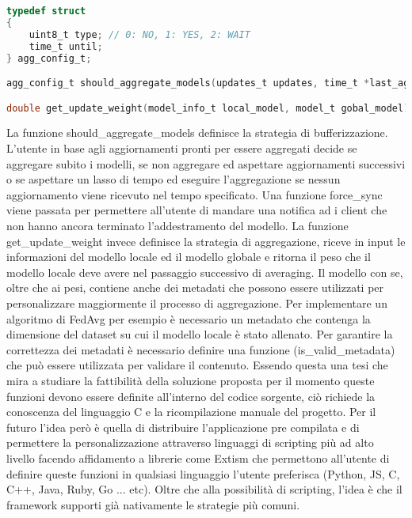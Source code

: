 \documentclass[a4paper, oneside, openright]{report}
\begin{document}
\lstset{style=longBlock}
\begin{lstlisting}[language=C]
typedef struct
{
    uint8_t type; // 0: NO, 1: YES, 2: WAIT
    time_t until;
} agg_config_t;

agg_config_t should_aggregate_models(updates_t updates, time_t *last_aggregation, func_t force_sync)

double get_update_weight(model_info_t local_model, model_t gobal_model)
\end{lstlisting}
\lstset{style=codeStyle}

La funzione should\_aggregate\_models definisce la strategia di bufferizzazione. L'utente in base agli aggiornamenti pronti per essere aggregati decide se aggregare subito i modelli, se non aggregare ed aspettare aggiornamenti successivi o se aspettare un lasso di tempo ed eseguire l'aggregazione se nessun aggiornamento viene ricevuto nel tempo specificato. Una funzione force\_sync viene passata per permettere all'utente di mandare una notifica ad i client che non hanno ancora terminato l'addestramento del modello. La funzione get\_update\_weight invece definisce la strategia di aggregazione, riceve in input le informazioni del modello locale ed il modello globale e ritorna il peso che il modello locale deve avere nel passaggio successivo di averaging. Il modello con se, oltre che ai pesi, contiene anche dei metadati che possono essere utilizzati per personalizzare maggiormente il processo di aggregazione. Per implementare un algoritmo di FedAvg per esempio è necessario un metadato che contenga la dimensione del dataset su cui il modello locale è stato allenato. Per garantire la correttezza dei metadati è necessario definire una funzione (is\_valid\_metadata) che può essere utilizzata per validare il contenuto. Essendo questa una tesi che mira a studiare la fattibilità della soluzione proposta per il momento queste funzioni devono essere definite all'interno del codice sorgente, ciò richiede la conoscenza del linguaggio C e la ricompilazione manuale del progetto. Per il futuro l'idea però è quella di distribuire l'applicazione pre compilata e di permettere la personalizzazione attraverso linguaggi di scripting più ad alto livello facendo affidamento a librerie come Extism \cite{exitism} che permettono all'utente di definire queste funzioni in qualsiasi linguaggio l'utente preferisca (Python, JS, C, C++, Java, Ruby, Go ... etc). Oltre che alla possibilità di scripting, l'idea è che il framework supporti già nativamente le strategie più comuni.

 
\newpage
\end{document}
